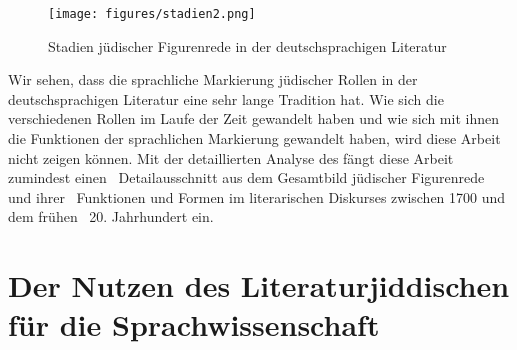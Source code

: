  \begin{figure}[h!]
  \centering
\texttt{[image: figures/stadien2.png]}
		\caption{\label{stadien} Stadien jüdischer Figurenrede in der deutschsprachigen Literatur}
		\end{figure}



\noindent Wir sehen, dass die sprachliche Markierung jüdischer Rollen in der deutschsprachigen Literatur eine sehr lange Tradition hat. Wie sich die verschiedenen Rollen im Laufe der Zeit gewandelt haben und wie sich 
mit ihnen 
die Funktionen der sprachlichen Markierung gewandelt haben, wird diese Arbeit nicht zeigen können. Mit der detaillierten Analyse des  fängt diese Arbeit zumindest einen \,%
Detailausschnitt aus dem Gesamtbild jüdischer Figurenrede und ihrer \,%
Funktionen und Formen im literarischen Diskurses zwischen 1700 und dem frühen \,%
20. Jahrhundert ein. 



\chapter{Der Nutzen des Literaturjiddischen für die Sprachwissenschaft}\label{lijisprachwissenschaft}



